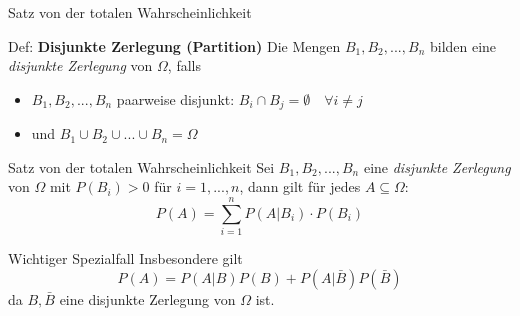 \documentclass[
  10pt,
  ignorenonframetext,
]{beamer}
\providecommand{\tightlist}{%
  \setlength{\itemsep}{0pt}\setlength{\parskip}{0pt}}
\begin{document}

\begin{frame}{Satz von der totalen Wahrscheinlichkeit}
\protect\hypertarget{satz-von-der-totalen-wahrscheinlichkeit}{}
\begin{block}{Def: \textbf{Disjunkte Zerlegung (Partition)}}
\protect\hypertarget{def-disjunkte-zerlegung-partition}{}
Die Mengen \(B_1, B_2, ..., B_n\) bilden eine \emph{disjunkte Zerlegung}
von \(\Omega\), falls

\begin{itemize}
\tightlist
\item
  \(B_1, B_2, ..., B_n\) paarweise disjunkt:
  \(B_i \cap B_j = \emptyset \quad \forall i \neq j\)
\item
  und \(B_1 \cup B_2 \cup ... \cup B_n = \Omega\)
\end{itemize}
\end{block}

\begin{block}{Satz von der totalen Wahrscheinlichkeit}
\protect\hypertarget{satz-von-der-totalen-wahrscheinlichkeit-1}{}
Sei \(B_1, B_2, ..., B_n\) eine \emph{disjunkte Zerlegung} von
\(\Omega\) mit \(P(B_i) > 0\) für \(i=1,..., n\), dann gilt für jedes
\(A \subseteq \Omega\): \[ P(A) = \sum_{i=1}^n P(A|B_i) \cdot P(B_i) \]
\end{block}
\end{frame}

\begin{frame}{Wichtiger Spezialfall}
\protect\hypertarget{wichtiger-spezialfall}{}
Insbesondere gilt \[ P(A) = P(A|B)P(B) + P(A|\bar{B})P(\bar{B})\] da
\(B, \bar{B}\) eine disjunkte Zerlegung von \(\Omega\) ist.

\end{frame}
\end{document}
